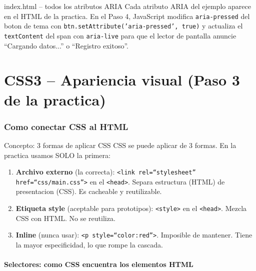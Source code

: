 \documentclass[11pt,a4paper]{article}
\begin{document}
	\begin{cajapractica}{index.html -- todos los atributos ARIA}
		Cada atributo ARIA del ejemplo aparece en el HTML de la practica. En el Paso 4, JavaScript modifica \texttt{aria-pressed} del boton de tema con \texttt{btn.setAttribute('aria-pressed', true)} y actualiza el \texttt{textContent} del span con \texttt{aria-live} para que el lector de pantalla anuncie ``Cargando datos...'' o ``Registro exitoso''.
	\end{cajapractica}
	
	\newpage
	
	\part{CSS3 -- Apariencia visual (Paso 3 de la practica)}
	
	\section{Como conectar CSS al HTML}
	
	\begin{cajaconcepto}{Concepto: 3 formas de aplicar CSS}
		CSS se puede aplicar de 3 formas. En la practica usamos SOLO la primera:
		
		\begin{enumerate}[leftmargin=1.5em,itemsep=3pt]
			\item \textbf{Archivo externo} (la correcta): \texttt{<link rel=``stylesheet'' href=``css/main.css''>} en el \texttt{<head>}. Separa estructura (HTML) de presentacion (CSS). Es cacheable y reutilizable.
			\item \textbf{Etiqueta style} (aceptable para prototipos): \texttt{<style>} en el \texttt{<head>}. Mezcla CSS con HTML. No se reutiliza.
			\item \textbf{Inline} (nunca usar): \texttt{<p style=``color:red''>}. Imposible de mantener. Tiene la mayor especificidad, lo que rompe la cascada.
		\end{enumerate}
	\end{cajaconcepto}
	
	\subsection{Selectores: como CSS encuentra los elementos HTML}
	
\end{document}
